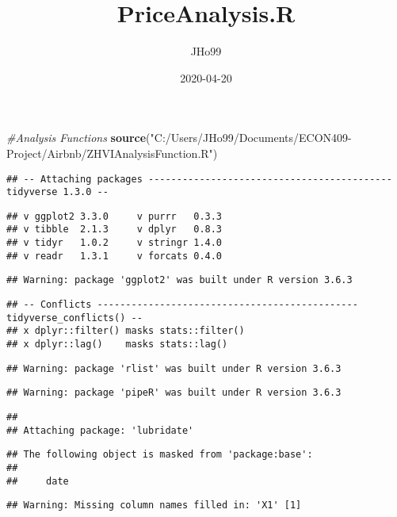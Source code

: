 \documentclass[
]{article}
\title{PriceAnalysis.R}
\author{JHo99}
\date{2020-04-20}
\newenvironment{Shaded}{\begin{snugshade}}{\end{snugshade}}
\newcommand{\CommentTok}[1]{\textcolor[rgb]{0.56,0.35,0.01}{\textit{#1}}}
\newcommand{\KeywordTok}[1]{\textcolor[rgb]{0.13,0.29,0.53}{\textbf{#1}}}
\newcommand{\NormalTok}[1]{#1}
\newcommand{\StringTok}[1]{\textcolor[rgb]{0.31,0.60,0.02}{#1}}
\begin{document}
\maketitle

\begin{Shaded}
\begin{Highlighting}[]
\CommentTok{#Analysis Functions}
\KeywordTok{source}\NormalTok{(}\StringTok{"C:/Users/JHo99/Documents/ECON409-Project/Airbnb/ZHVIAnalysisFunction.R"}\NormalTok{)}
\end{Highlighting}
\end{Shaded}

\begin{verbatim}
## -- Attaching packages ------------------------------------------- tidyverse 1.3.0 --
\end{verbatim}

\begin{verbatim}
## v ggplot2 3.3.0     v purrr   0.3.3
## v tibble  2.1.3     v dplyr   0.8.3
## v tidyr   1.0.2     v stringr 1.4.0
## v readr   1.3.1     v forcats 0.4.0
\end{verbatim}

\begin{verbatim}
## Warning: package 'ggplot2' was built under R version 3.6.3
\end{verbatim}

\begin{verbatim}
## -- Conflicts ---------------------------------------------- tidyverse_conflicts() --
## x dplyr::filter() masks stats::filter()
## x dplyr::lag()    masks stats::lag()
\end{verbatim}

\begin{verbatim}
## Warning: package 'rlist' was built under R version 3.6.3
\end{verbatim}

\begin{verbatim}
## Warning: package 'pipeR' was built under R version 3.6.3
\end{verbatim}

\begin{verbatim}
## 
## Attaching package: 'lubridate'
\end{verbatim}

\begin{verbatim}
## The following object is masked from 'package:base':
## 
##     date
\end{verbatim}

\begin{verbatim}
## Warning: Missing column names filled in: 'X1' [1]
\end{verbatim}
\end{document}
